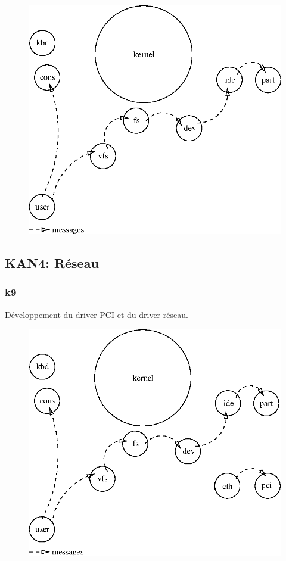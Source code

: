 \documentclass[10pt,a4wide]{article}
\begin{document}
\begin{figure}[h]
\centerline{\includegraphics{figures/k8.eps}}
\end{figure}

\newpage

\subsection{KAN4: R\'eseau}

\subsubsection{k9}

D\'eveloppement du driver PCI et du driver r\'eseau.

\vspace{5cm}

\begin{figure}[h]
\centerline{\includegraphics{figures/k9.eps}}
\end{figure}
\end{document}
